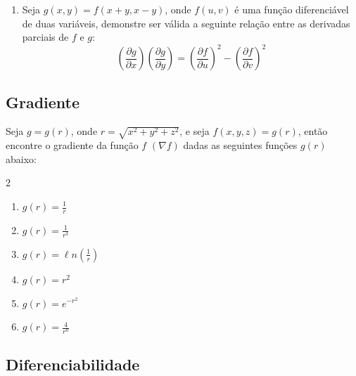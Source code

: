 \begin{enumerate}
  seja $f(v) = g(r)$, então demonstre que vale a seguinte relação:
  \[
  \left(\frac{\partial g}{\partial r}\right)^2 
  = \left(\frac{\partial f}{\partial x}\right)^2 
  + \left(\frac{\partial f }{\partial y}\right)^2 
  + \left(\frac{\partial f}{\partial z}\right)^2
  \]
  \item Seja $g(x,y) = f(x+y,x-y)$, onde $f(u,v)$ é uma função 
  diferenciável de duas variáveis, demonstre ser válida a seguinte 
  relação entre as derivadas parciais de $f$ e $g$:
  \[
  \left(\frac{\partial g}{\partial x}\right) 
  \left(\frac{\partial g}{\partial y}\right) 
  = \left(\frac{\partial f}{\partial u}\right)^2 
  - \left(\frac{\partial f}{\partial v}\right)^2 
  \]
\end{enumerate}


\subsection{Gradiente}
 
Seja $g = g(r)$, onde $r = \sqrt{x^2+y^2+z^2}$, e seja $f(x,y,z) = g(r)$, então encontre o gradiente da função $f$ $(\nabla f)$ dadas as seguintes funções  $g(r)$ abaixo: 
%
\begin{multicols}{2}
\begin{enumerate}
	\item $g(r) = \frac{1}{r}$
	\item $g(r) = \frac{1}{r^3}$
	\item $g(r) = \ell n\left(\frac{1}{r} \right)$
	\item $g(r) = r^2 $
	\item $g(r) = e^{-r^2}$
	\item $g(r) = \frac{4}{r^n}$  
\end{enumerate}
\end{multicols}



\subsection{Diferenciabilidade}

